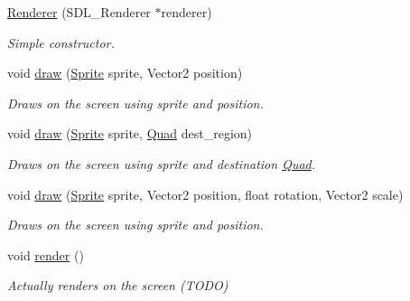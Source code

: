 \begin{DoxyCompactItemize}
\item 
\mbox{\hyperlink{classinferno_1_1graphics_1_1_renderer_a78582146833f7a01fc9a11edae613d51}{Renderer}} (S\+D\+L\+\_\+\+Renderer $\ast$renderer)
\begin{DoxyCompactList}\small\item\em Simple constructor. \end{DoxyCompactList}\item 
void \mbox{\hyperlink{classinferno_1_1graphics_1_1_renderer_a2ce12da4c416e5c3873a8cf40255c6c4}{draw}} (\mbox{\hyperlink{classinferno_1_1graphics_1_1_sprite}{Sprite}} sprite, Vector2 position)
\begin{DoxyCompactList}\small\item\em Draws on the screen using sprite and position. \end{DoxyCompactList}\item 
void \mbox{\hyperlink{classinferno_1_1graphics_1_1_renderer_a0fece22ee034838860dbfc4e11281895}{draw}} (\mbox{\hyperlink{classinferno_1_1graphics_1_1_sprite}{Sprite}} sprite, \mbox{\hyperlink{classinferno_1_1graphics_1_1_quad}{Quad}} dest\+\_\+region)
\begin{DoxyCompactList}\small\item\em Draws on the screen using sprite and destination \mbox{\hyperlink{classinferno_1_1graphics_1_1_quad}{Quad}}. \end{DoxyCompactList}\item 
void \mbox{\hyperlink{classinferno_1_1graphics_1_1_renderer_a5f72164c93ad346bce319c61fdecaab8}{draw}} (\mbox{\hyperlink{classinferno_1_1graphics_1_1_sprite}{Sprite}} sprite, Vector2 position, float rotation, Vector2 scale)
\begin{DoxyCompactList}\small\item\em Draws on the screen using sprite and position. \end{DoxyCompactList}\item 
\mbox{\label{classinferno_1_1graphics_1_1_renderer_ad8a81e66396583cdb9f37d4ff45188d7}} 
void \mbox{\hyperlink{classinferno_1_1graphics_1_1_renderer_ad8a81e66396583cdb9f37d4ff45188d7}{render}} ()
\begin{DoxyCompactList}\small\item\em Actually renders on the screen (T\+O\+DO) \end{DoxyCompactList}\end{DoxyCompactItemize}


